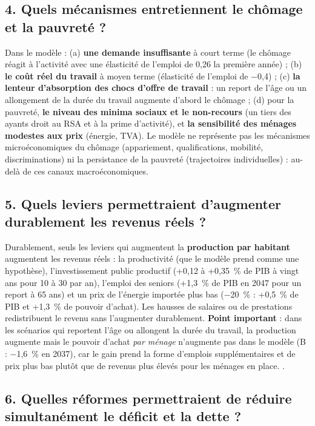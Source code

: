 \subsection*{4. Quels mécanismes entretiennent le chômage et la pauvreté ?}

Dans le modèle : (a) \textbf{une demande insuffisante} à court terme (le chômage réagit à l'activité avec une élasticité
de l'emploi de 0,26 la première année) ; (b) \textbf{le coût réel du travail} à moyen terme (élasticité de l'emploi de
$-$0,4) ; (c) \textbf{la lenteur d'absorption des chocs d'offre de travail} : un report de l'âge ou un allongement de la
durée du travail augmente d'abord le chômage ; (d) pour la pauvreté, \textbf{le niveau des minima sociaux et le non-recours}
(un tiers des ayants droit au RSA et à la prime d'activité), et \textbf{la sensibilité des ménages modestes aux prix}
(énergie, TVA). Le modèle ne représente pas les mécanismes microéconomiques du chômage (appariement, qualifications,
mobilité, discriminations) ni la persistance de la pauvreté (trajectoires individuelles) :  au-delà
de ces canaux macroéconomiques.

\subsection*{5. Quels leviers permettraient d'augmenter durablement les revenus réels ?}

Durablement, seuls les leviers qui augmentent la \textbf{production par habitant} augmentent les revenus réels : la
productivité (que le modèle prend comme une hypothèse), l'investissement public productif (+0,12 à +0,35~\% de PIB à
vingt ans pour 10 à 30\md{} par an), l'emploi des seniors (+1,3~\% de PIB en 2047 pour un report à 65 ans) et un prix de
l'énergie importée plus bas ($-$20~\% : +0,5~\% de PIB et +1,3~\% de pouvoir d'achat). Les hausses de salaires ou de
prestations redistribuent le revenu sans l'augmenter durablement. \textbf{Point important} : dans les scénarios qui
reportent l'âge ou allongent la durée du travail, la production augmente mais le pouvoir d'achat \emph{par ménage}
n'augmente pas dans le modèle (B : $-$1,6~\% en 2037), car le gain prend la forme d'emplois supplémentaires et de prix plus
bas plutôt que de revenus plus élevés pour les ménages en place. .

\subsection*{6. Quelles réformes permettraient de réduire simultanément le déficit et la dette ?}

